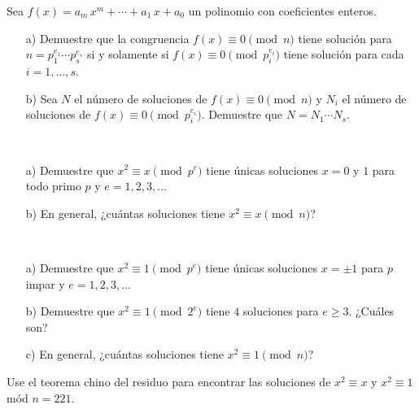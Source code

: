 \documentclass{article}
\begin{document}
\begin{problema}
  Sea $f (x) = a_m\,x^m + \cdots + a_1\,x + a_0$ un polinomio con coeficientes
  enteros.

  \begin{enumerate}
  \item[a)] Demuestre que la congruencia $f (x) \equiv 0 \pmod{n}$ tiene
    solución para $n = p_1^{e_1} \cdots p_s^{e_s}$ si y solamente si
    $f (x) \equiv 0 \pmod{p_i^{e_i}}$ tiene solución para cada $i = 1,\ldots,s$.

  \item[b)] Sea $N$ el número de soluciones de $f (x) \equiv 0 \pmod{n}$ y $N_i$
    el número de soluciones de $f (x) \equiv 0 \pmod{p_i^{e_i}}$. Demuestre que
    $N = N_1 \cdots N_s$.
  \end{enumerate}
\end{problema}

\begin{problema}
  ~

  \begin{enumerate}
  \item[a)] Demuestre que $x^2 \equiv x \pmod{p^e}$ tiene únicas soluciones
    $x = 0$ y $1$ para todo primo $p$ y $e = 1,2,3,\ldots$

  \item[b)] En general, ¿cuántas soluciones tiene $x^2 \equiv x \pmod{n}$?
  \end{enumerate}
\end{problema}

\begin{problema}
  ~

  \begin{enumerate}
  \item[a)] Demuestre que $x^2 \equiv 1 \pmod{p^e}$ tiene únicas soluciones
    $x = \pm 1$ para $p$ impar y $e = 1,2,3,\ldots$

  \item[b)] Demuestre que $x^2 \equiv 1 \pmod{2^e}$ tiene $4$ soluciones para
    $e \ge 3$. ¿Cuáles son?

  \item[c)] En general, ¿cuántas soluciones tiene $x^2 \equiv 1 \pmod{n}$?
  \end{enumerate}
\end{problema}

\begin{problema}
  Use el teorema chino del residuo para encontrar las soluciones de
  $x^2 \equiv x$ y $x^2 \equiv 1$ mód $n = 221$.
\end{problema}
\end{document}
